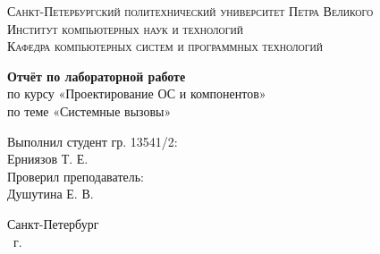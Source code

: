 \begin{titlepage}
    \centering
    \textsc{Санкт-Петербургский политехнический университет Петра Великого}\\[3mm]
    \textsc{Институт компьютерных наук и технологий}\\[3mm]
    \textsc{Кафедра компьютерных систем и программных технологий}
	
	\vfill
	
	\textbf{Отчёт по лабораторной работе }\\[3mm]
	по курсу «Проектирование ОС и компонентов»\\[3mm]
	по теме «Системные вызовы»\\[41mm]
	
    \begin{flushright}
	\begin{minipage}{.35\textwidth}
		Выполнил студент гр. 13541/2:\\
		Ерниязов Т. Е.\\[3mm]
		Проверил преподаватель:\\
		Душутина Е. В.
	\end{minipage}
    \end{flushright}
	
	\vfill

	Санкт-Петербург\\
	\the\year\ г.
\end{titlepage}
